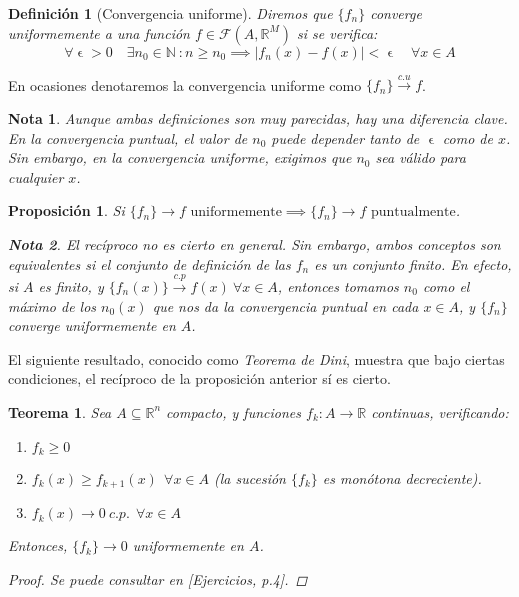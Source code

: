 \documentclass[11pt, a4paper]{article}
\let\epsilon\upvarepsilon
\providecommand{\abs}[1]{\lvert#1\rvert}
\newcommand{\R}{\mathbb{R}}
\newcommand{\fn}{\{f_n\}}
\theoremstyle{theorem-style}
\newtheorem{nth}{Teorema}[section]
\newtheorem{nprop}{Proposición}[section]
\theoremstyle{definition-style}
\newtheorem{ndef}{Definición}[section]
\theoremstyle{remark-style}
\newtheorem*{nota}{Nota}
\theoremstyle{example-style}
\newenvironment{nlist}
{\begin{enumerate}
    \renewcommand\labelenumi{(\emph{\roman{enumi})}}}
  {\end{enumerate}}
\begin{document}
\begin{ndef}[Convergencia uniforme] Diremos que $\fn$ converge uniformemente a una función $f \in \mathcal{F}(A,\mathbb{R}^M)$ si se verifica:
  \[
    \forall \epsilon>0 \quad \exists n_0 \in \mathbb{N}\ : n\ge n_0\implies \abs{f_n(x)-f(x)} < \epsilon \quad \forall x \in A
  \]
\end{ndef}

En ocasiones denotaremos la convergencia uniforme como $\fn \xrightarrow {c.u} f$.

\begin{nota}
  Aunque ambas definiciones son muy parecidas, hay una diferencia clave. En la convergencia puntual, el valor de $n_0$ puede depender tanto de $\epsilon$ como de $x$. Sin embargo, en la convergencia uniforme, exigimos que $n_0$ sea válido para cualquier $x$.
\end{nota}

\begin{nprop}
  Si $\fn\to f \text{ uniformemente} \implies \fn \to f \text{ puntualmente}$. 
  \begin{nota}
    El recíproco no es cierto en general. Sin embargo, ambos conceptos son equivalentes si el conjunto de definición de las $f_n$ es un conjunto finito. En efecto, si $A$ es finito, y $\{f_n(x)\} \xrightarrow {c.p} f(x) \ \forall x \in A$, entonces tomamos $n_0$ como el máximo de los $n_0(x)$ que nos da la convergencia puntual en cada $x \in A$, y $\fn$ converge uniformemente en $A$.
  \end{nota}
\end{nprop}

El siguiente resultado, conocido como \textit{Teorema de Dini}, muestra que bajo ciertas condiciones, el recíproco de la proposición anterior sí es cierto.

\begin{nth}
  \label{1}
  Sea $A\subseteq \R^n$ compacto, y funciones $f_k : A \to \mathbb{R}$ continuas, verificando:

  \begin{nlist}
  \item $f_k \geq 0$
  \item $f_k(x) \geq f_{k+1}(x)\ \ \forall x \in A$ (la sucesión $\{f_k\}$ es monótona decreciente).
  \item $f_k(x) \to 0\ c.p.\ \ \forall x \in A$
  \end{nlist}

  Entonces, $\{f_k\} \to 0$ uniformemente en $A$.

  \begin{proof}
    Se puede consultar en \textit{[Ejercicios, p.4]}.
  \end{proof}
\end{nth}
\end{document}
